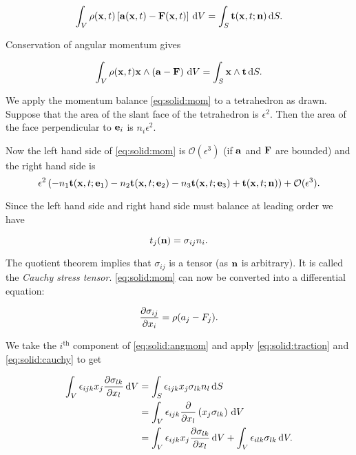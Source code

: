 \documentclass{notes}
\newcommand{\cO}{\mathcal{O}}
\begin{document}
\begin{equation}\label{eq:solid:mom}
\int_V \rho(\mathbf{x},t) \left[ \mathbf{a}(\mathbf{x},t) - \mathbf{F}(\mathbf{x},t) \right]\, \mathrm{d} V
= \int_S \mathbf{t}(\mathbf{x},t;\mathbf{n})\, \mathrm{d} S.
\end{equation}

Conservation of angular momentum gives

\begin{equation}\label{eq:solid:angmom}
\int_V \rho(\mathbf{x},t) \mathbf{x} \wedge \left( \mathbf{a} - \mathbf{F} \right)\, \mathrm{d} V
= \int_S \mathbf{x} \wedge \mathbf{t}\, \mathrm{d} S.
\end{equation}

We apply the momentum balance \eqref{eq:solid:mom} to a
tetrahedron as drawn.  Suppose that the area of the slant face of the
tetrahedron is $\epsilon^2$.  Then the area of the face
perpendicular to $\mathbf{e}_i$ is $n_i \epsilon^2$.

Now the left hand side of \eqref{eq:solid:mom} is $\cO(\epsilon^3)$
(if $\mathbf{a}$ and $\mathbf{F}$ are bounded) and the right hand side is
\[
\epsilon^2 \left(-n_1 \t(\vx,t;\vect{e}_1) - n_2 \t(\vx,t;\vect{e}_2) -n_3
  \t(\vx,t;\vect{e}_3) + \t(\vx,t;\vn) \right) + \cO(\epsilon^3).
\]

Since the left hand side and right hand side must balance at leading order
we have

\begin{equation}\label{eq:solid:traction}
t_j(\mathbf{n}) = \sigma_{ij} n_i.
\end{equation}

The quotient theorem implies that $\sigma_{ij}$ is a tensor (as $\mathbf{n}$
is arbitrary).  It is called the \emph{Cauchy stress tensor}.
\eqref{eq:solid:mom} can now be converted into a differential
equation:

\begin{equation}\label{eq:solid:cauchy}
\frac{\partial \sigma_{ij}}{\partial x_i} = \rho (a_j - F_j).
\end{equation}

We take the $i^{\text{th}}$ component of \eqref{eq:solid:angmom}
and apply \eqref{eq:solid:traction} and \eqref{eq:solid:cauchy} to get

\begin{align*}
\int_V \epsilon_{ijk} x_j \frac{\partial \sigma_{lk}}{\partial x_l}\, \mathrm{d} V
&= \int_S \epsilon_{ijk} x_j \sigma_{lk} n_l\, \mathrm{d} S \\
&= \int_V \epsilon_{ijk} \frac{\partial }{\partial x_l}\left(x_j \sigma_{lk}\right)\, \mathrm{d} V \\
&= \int_V \epsilon_{ijk} x_j \frac{\partial \sigma_{lk}}{\partial x_l}\, \mathrm{d} V
+ \int_V \epsilon_{ilk} \sigma_{lk}\, \mathrm{d} V.
\end{align*}
\end{document}
